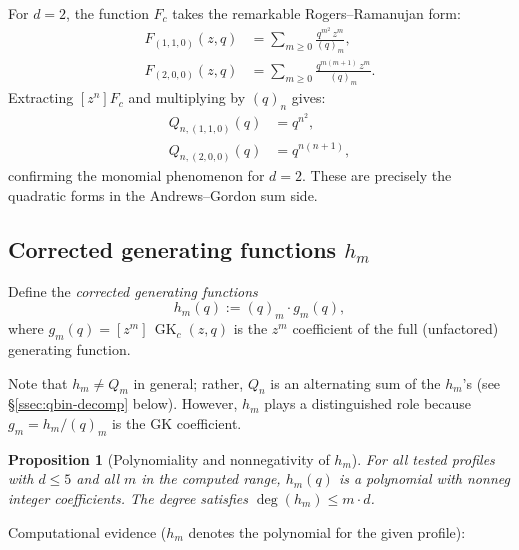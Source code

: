 \documentclass[11pt]{article}
\newtheorem{proposition}[theorem]{Proposition}
\newcommand{\GK}{\operatorname{GK}}
\begin{document}
For $d = 2$, the function $F_c$ takes the remarkable Rogers--Ramanujan form:
\begin{align}
  F_{(1,1,0)}(z,q) &= \sum_{m \geq 0} \frac{q^{m^2}\, z^m}{(q)_m},
    \label{eq:RR-first} \\
  F_{(2,0,0)}(z,q) &= \sum_{m \geq 0} \frac{q^{m(m+1)}\, z^m}{(q)_m}.
    \label{eq:RR-second}
\end{align}
Extracting $[z^n] F_c$ and multiplying by $(q)_n$ gives:
\begin{align*}
  Q_{n,(1,1,0)}(q) &= q^{n^2}, \\
  Q_{n,(2,0,0)}(q) &= q^{n(n+1)},
\end{align*}
confirming the monomial phenomenon for $d = 2$. These are precisely the
quadratic forms in the Andrews--Gordon sum side.

\subsection{Corrected generating functions $h_m$}

Define the \emph{corrected generating functions}
\begin{equation}
  h_m(q) := (q)_m \cdot g_m(q),
  \label{eq:h-m-def}
\end{equation}
where $g_m(q) = [z^m]\, \GK_c(z,q)$ is the $z^m$ coefficient of the full
(unfactored) generating function.

Note that $h_m \neq Q_m$ in general; rather, $Q_n$ is an alternating sum of the
$h_m$'s (see \S\ref{ssec:qbin-decomp} below). However, $h_m$ plays a
distinguished role because $g_m = h_m/(q)_m$ is the GK coefficient.

\begin{proposition}[Polynomiality and nonnegativity of $h_m$]
\label{prop:h-m-nonneg}
For all tested profiles with $d \leq 5$ and all $m$ in the computed range,
$h_m(q)$ is a polynomial with nonneg integer coefficients. The degree satisfies
$\deg(h_m) \leq m \cdot d$.
\end{proposition}

Computational evidence ($h_m$ denotes the polynomial for the given profile):
\end{document}
